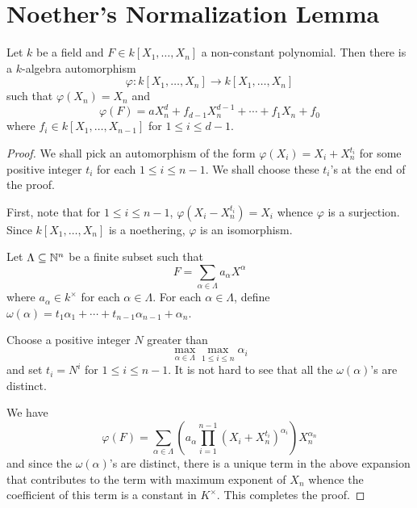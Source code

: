 \section{Noether's Normalization Lemma}

\begin{lemma}
    Let $k$ be a field and $F\in k[X_1,\dots,X_n]$ a non-constant polynomial. Then there is a $k$-algebra automorphism 
    \begin{equation*}
        \varphi: k[X_1,\dots,X_n]\to k[X_1,\dots,X_n]
    \end{equation*}
    such that $\varphi(X_n) = X_n$ and 
    \begin{equation*}
        \varphi(F) = aX_n^d + f_{d - 1}X_n^{d - 1} + \cdots + f_1X_n + f_0
    \end{equation*}
    where $f_i\in k[X_1,\dots,X_{n - 1}]$ for $1\le i\le d - 1$.
\end{lemma}
\begin{proof}
    We shall pick an automorphism of the form $\varphi(X_i) = X_i + X_n^{t_i}$ for some positive integer $t_i$ for each $1\le i\le n - 1$. We shall choose these $t_i$'s at the end of the proof.

    First, note that for $1\le i\le n - 1$, $\varphi(X_i - X_n^{t_i}) = X_i$ whence $\varphi$ is a surjection. Since $k[X_1,\dots,X_n]$ is a noethering, $\varphi$ is an isomorphism.

    Let $\Lambda\subseteq\mathbb{N}^n$ be a finite subset such that 
    \begin{equation*}
        F = \sum_{\alpha\in\Lambda}a_\alpha X^\alpha
    \end{equation*}
    where $a_\alpha\in k^\times$ for each $\alpha\in\Lambda$. For each $\alpha\in\Lambda$, define $\omega(\alpha) = t_1\alpha_1 + \cdots + t_{n - 1}\alpha_{n - 1} + \alpha_n$.

    Choose a positive integer $N$ greater than 
    \begin{equation*}
        \max_{\alpha\in\Lambda}\max_{1\le i\le n}\alpha_i
    \end{equation*}
    and set $t_i = N^i$ for $1\le i\le n - 1$. It is not hard to see that all the $\omega(\alpha)$'s are distinct. 

    We have 
    \begin{equation*}
        \varphi(F) = \sum_{\alpha\in\Lambda}\left(a_\alpha\prod_{i = 1}^{n - 1}(X_i + X_n^{t_i})^{\alpha_i}\right)X_n^{\alpha_n}
    \end{equation*}
    and since the $\omega(\alpha)$'s are distinct, there is a unique term in the above expansion that contributes to the term with maximum exponent of $X_n$ whence the coefficient of this term is a constant in $K^\times$. This completes the proof.
\end{proof}


